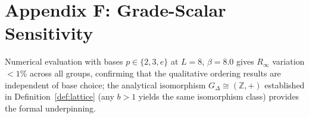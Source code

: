 
\section*{Appendix F: Grade-Scalar Sensitivity}
\label{app:sensitivity}


Numerical evaluation with bases $p\in\{2,3,e\}$ at $L=8$, $\beta=8.0$ gives
$R_\infty$ variation $<1\%$ across all groups, confirming that the qualitative
ordering results are independent of base choice; the analytical isomorphism
$G_\Delta \cong (\mathbb{Z},+)$ established in Definition~\ref{def:lattice}
(any $b>1$ yields the same isomorphism class) provides the formal underpinning.
